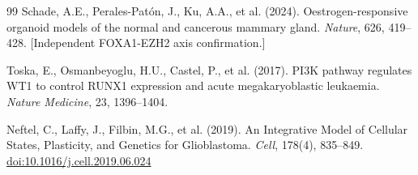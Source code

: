 \documentclass[11pt, a4paper]{article}
\begin{document}
\begin{thebibliography}{99}
Schade, A.E., Perales-Patón, J., Ku, A.A., et al.
(2024).
Oestrogen-responsive organoid models of the
normal and cancerous mammary gland.
\textit{Nature}, 626, 419--428.
[Independent FOXA1-EZH2 axis confirmation.]

Toska, E., Osmanbeyoglu, H.U., Castel, P., et al.
(2017).
PI3K pathway regulates WT1 to control RUNX1
expression and acute megakaryoblastic leukaemia.
\textit{Nature Medicine}, 23, 1396--1404.

Neftel, C., Laffy, J., Filbin, M.G., et al. (2019).
An Integrative Model of Cellular States, Plasticity,
and Genetics for Glioblastoma.
\textit{Cell}, 178(4), 835--849.
\href{https://doi.org/10.1016/j.cell.2019.06.024}{%
doi:10.1016/j.cell.2019.06.024}

\end{thebibliography}
\end{document}

